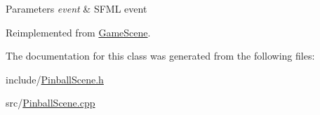 \begin{DoxyParams}{Parameters}
{\em event} & S\+F\+M\+L event \\
\hline
\end{DoxyParams}


Reimplemented from \hyperlink{class_game_scene_a9cf68fbf8e0805cbb1618a71e04d7fa4}{Game\+Scene}.



The documentation for this class was generated from the following files\+:\begin{DoxyCompactItemize}
\item 
include/\hyperlink{_pinball_scene_8h}{Pinball\+Scene.\+h}\item 
src/\hyperlink{_pinball_scene_8cpp}{Pinball\+Scene.\+cpp}\end{DoxyCompactItemize}
